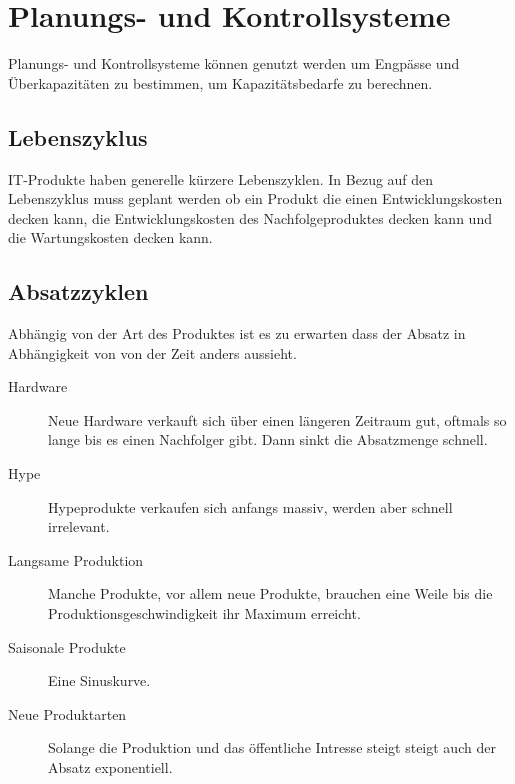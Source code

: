 \documentclass{article}
\begin{document}
\section{Planungs- und Kontrollsysteme} 
Planungs- und Kontrollsysteme können genutzt werden um Engpässe und Überkapazitäten zu bestimmen, um Kapazitätsbedarfe zu berechnen.

\subsection{Lebenszyklus}
IT-Produkte haben generelle kürzere Lebenszyklen. In Bezug auf den Lebenszyklus muss geplant werden ob ein Produkt die einen Entwicklungskosten decken kann, die Entwicklungskosten des Nachfolgeproduktes decken kann und die Wartungskosten decken kann.

\subsection{Absatzzyklen}
Abhängig von der Art des Produktes ist es zu erwarten dass der Absatz in Abhängigkeit von von der Zeit anders aussieht.
\begin{description}
 \item[Hardware] Neue Hardware verkauft sich über einen längeren Zeitraum gut, oftmals so lange bis es einen Nachfolger gibt. Dann sinkt die Absatzmenge schnell.
 \item[Hype] Hypeprodukte verkaufen sich anfangs massiv, werden aber schnell irrelevant.
 \item[Langsame Produktion] Manche Produkte, vor allem neue Produkte, brauchen eine Weile bis die Produktionsgeschwindigkeit ihr Maximum erreicht.
 \item[Saisonale Produkte] Eine Sinuskurve.
 \item[Neue Produktarten] Solange die Produktion und das öffentliche Intresse steigt steigt auch der Absatz exponentiell.
\end{description}
\end{document}
